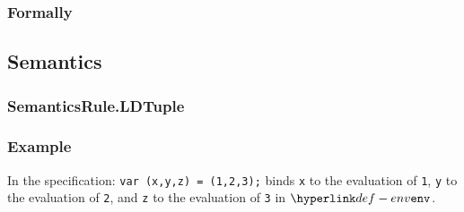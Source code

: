 \subsubsection{Formally}
\begin{mathpar}
\end{mathpar}

\subsection{Semantics}
\subsubsection{SemanticsRule.LDTuple\label{sec:SemanticsRule.LDTuple}}
\subsubsection{Example}
In the specification:
\texttt{var (x,y,z) = (1,2,3);} binds \texttt{x} to the evaluation of
\texttt{1}, \texttt{y} to the evaluation of \texttt{2}, and \texttt{z} to the
evaluation of \texttt{3} in $\env$.

